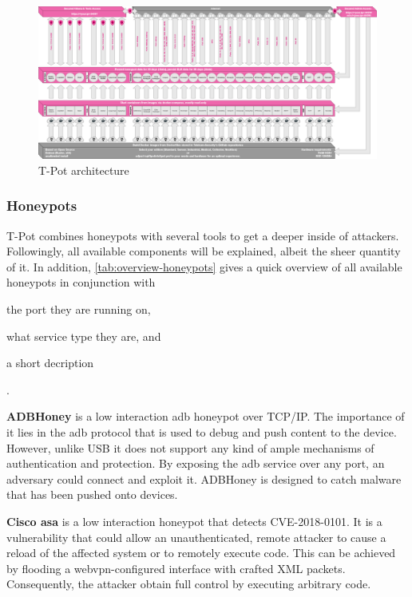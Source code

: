 \begin{figure}
    \centering
    \includegraphics[width=\textwidth]{figures/architecture.png}
    \caption[T-Pot architecture]{T-Pot architecture}
    \label{fig:overview-tpot}
\end{figure}

\subsubsection{Honeypots}

T-Pot combines honeypots with several tools to get a deeper inside of attackers.
Followingly, all available components will be explained, albeit the sheer quantity of it.
In addition, \autoref{tab:overview-honeypots} gives a quick overview of all available honeypots in conjunction with
\begin{enumerate*}[label=(\roman*)]
    \item the port they are running on,
    \item what service type they are, and
    \item a short decription
\end{enumerate*}.

\textbf{ADBHoney} \cite{adbhoney2021} is a low interaction \ac{adb} honeypot over TCP/IP.
The importance of it lies in the \ac{adb} protocol that is used to debug and push content to the device.
However, unlike USB it does not support any kind of ample mechanisms of authentication and protection.
By exposing the \ac{adb} service over any port, an adversary could connect and exploit it.
ADBHoney is designed to catch malware that has been pushed onto devices.

\textbf{Cisco \ac{asa}} \cite{cymmetria2018} is a low interaction honeypot that detects CVE-2018-0101\cite{CVE-2018-0101}.
It is a vulnerability that could allow an unauthenticated, remote attacker to cause a reload of the affected system or to remotely execute code.
This can be achieved by flooding a webvpn-configured interface with crafted XML packets.
Consequently, the attacker obtain full control by executing arbitrary code.

